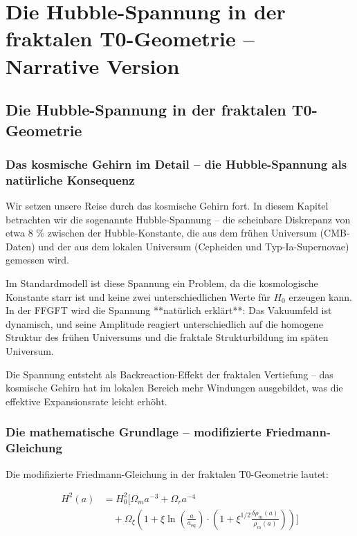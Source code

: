 \chapter{Die Hubble-Spannung in der fraktalen T0-Geometrie – Narrative Version}


\section{Die Hubble-Spannung in der fraktalen T0-Geometrie}
	
	\subsection*{Das kosmische Gehirn im Detail – die Hubble-Spannung als natürliche Konsequenz}
	
	Wir setzen unsere Reise durch das kosmische Gehirn fort. In diesem Kapitel betrachten wir die sogenannte Hubble-Spannung – die scheinbare Diskrepanz von etwa 8 \% zwischen der Hubble-Konstante, die aus dem frühen Universum (CMB-Daten) und der aus dem lokalen Universum (Cepheiden und Typ-Ia-Supernovae) gemessen wird.
	
	Im Standardmodell ist diese Spannung ein Problem, da die kosmologische Konstante starr ist und keine zwei unterschiedlichen Werte für $H_0$ erzeugen kann. In der FFGFT wird die Spannung **natürlich erklärt**: Das Vakuumfeld ist dynamisch, und seine Amplitude reagiert unterschiedlich auf die homogene Struktur des frühen Universums und die fraktale Strukturbildung im späten Universum.
	
	Die Spannung entsteht als Backreaction-Effekt der fraktalen Vertiefung – das kosmische Gehirn hat im lokalen Bereich mehr Windungen ausgebildet, was die effektive Expansionsrate leicht erhöht.
	
	\subsection*{Die mathematische Grundlage – modifizierte Friedmann-Gleichung}
	
	Die modifizierte Friedmann-Gleichung in der fraktalen T0-Geometrie lautet:
	
\begin{equation}
	\begin{aligned}
		H^2(a) &= H_0^2 \Biggl[ \Omega_m a^{-3} + \Omega_r a^{-4} \\
		&\quad + \Omega_\xi \left(1 + \xi \ln\left(\frac{a}{a_{\text{eq}}}\right) 
		\cdot \left(1 + \xi^{1/2} \frac{\delta \rho_m(a)}{\rho_m(a)}\right) \right) \Biggr]
	\end{aligned}
\end{equation}
	

